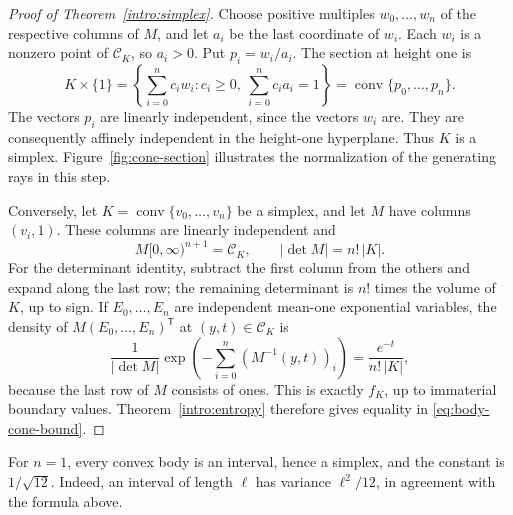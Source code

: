 \begin{proof}[Proof of Theorem~\ref{intro:simplex}]
Choose positive multiples $w_0,\ldots,w_n$ of the respective columns
of $M$, and let $a_i$ be the last coordinate of $w_i$.  Each $w_i$ is a nonzero point of
$\mathcal C_K$, so $a_i>0$.  Put $p_i=w_i/a_i$.  The section at
height one is
\begin{equation}\label{eq:body-cone-section}
  K\times\{1\}
  =\left\{\sum_{i=0}^n c_iw_i:
      c_i\geq0,\ \sum_{i=0}^n c_i a_i=1\right\}
  =\operatorname{conv}\{p_0,\ldots,p_n\}.
\end{equation}
The vectors $p_i$ are linearly independent, since the vectors $w_i$
are.  They are consequently affinely independent in the height-one
hyperplane.  Thus $K$ is a simplex.  Figure~\ref{fig:cone-section}
illustrates the normalization of the generating rays in this step.

Conversely, let $K=\operatorname{conv}\{v_0,\ldots,v_n\}$ be a
simplex, and let $M$ have columns $(v_i,1)$.  These columns are
linearly independent and
\[
  M[0,\infty)^{n+1}=\mathcal C_K,
  \qquad |\det M|=n!\,|K|.
\]
For the determinant identity, subtract the first column from the
others and expand along the last row; the remaining determinant is
$n!$ times the volume of $K$, up to sign.  If $E_0,\ldots,E_n$ are
independent mean-one exponential variables, the density of
$M(E_0,\ldots,E_n)^{\mathsf T}$ at $(y,t)\in\mathcal C_K$ is
\[
  \frac{1}{|\det M|}\exp\left(-\sum_{i=0}^n
    (M^{-1}(y,t))_i\right)
  =\frac{e^{-t}}{n!\,|K|},
\]
because the last row of $M$ consists of ones.  This is exactly
$f_K$, up to immaterial boundary values.  Theorem~\ref{intro:entropy}
therefore gives equality in \eqref{eq:body-cone-bound}.
\end{proof}

For $n=1$, every convex body is an interval, hence a simplex, and the
constant is $1/\sqrt{12}$.  Indeed, an interval of length $\ell$ has
variance $\ell^2/12$, in agreement with the formula above.

